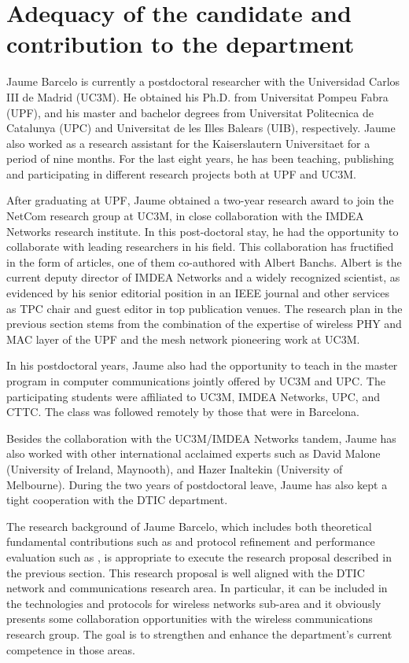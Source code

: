 \documentclass[a4paper,twocolumns]{article}%
\begin{document}
\section{Adequacy of the candidate and contribution to the department}

Jaume Barcelo is currently a postdoctoral researcher with the Universidad Carlos III de Madrid (UC3M). 
He obtained his Ph.D. from Universitat Pompeu Fabra (UPF), and his master and bachelor degrees from Universitat Politecnica de Catalunya (UPC) and Universitat de les Illes Balears (UIB), respectively. 
Jaume also worked as a research assistant for the Kaiserslautern Universitaet for a period of nine months.
For the last eight years, he has been teaching, publishing and participating in different research projects both at UPF and UC3M.


After graduating at UPF, Jaume obtained a two-year research award to join the NetCom research group at UC3M, in close collaboration with the IMDEA Networks research institute.
In this post-doctoral stay, he had the opportunity to collaborate with leading researchers in his field.
This collaboration has fructified in the form of articles, one of them co-authored with Albert Banchs.
Albert is the current deputy director of IMDEA Networks and a widely recognized scientist, as evidenced by his senior editorial position in an IEEE journal and other services as TPC chair and guest editor in top publication venues.
The research plan in the previous section stems from the combination of the expertise of wireless PHY and MAC layer of the UPF and the mesh network pioneering work at UC3M.

In his postdoctoral years, Jaume also had the opportunity to teach in the master program in computer communications jointly offered by UC3M and UPC.
The participating students were affiliated to UC3M, IMDEA Networks, UPC, and CTTC.
The class was followed remotely by those that were in Barcelona.

Besides the collaboration with the UC3M/IMDEA Networks tandem, Jaume has also worked with other international acclaimed experts such as David Malone (University of Ireland, Maynooth), and Hazer Inaltekin (University of Melbourne).
During the two years of postdoctoral leave, Jaume has also kept a tight cooperation with the DTIC department.

The research background of Jaume Barcelo, which includes both theoretical fundamental contributions such as \cite{barcelo2011opa} and protocol refinement and performance evaluation such as \cite{barcelo2011tcf}, is appropriate to execute the research proposal described in the previous section.
This research proposal is well aligned with the DTIC network and communications research area.
In particular, it can be included in the technologies and protocols for wireless networks sub-area and it obviously presents some collaboration opportunities with the wireless communications research group.
The goal is to strengthen and enhance the department's current competence in those areas.
\end{document}
